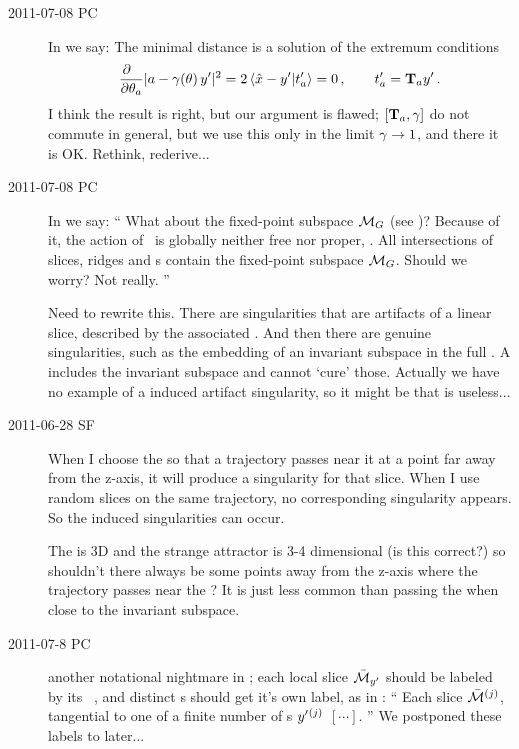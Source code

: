 \begin{description}
\item[2011-07-08 PC]
In  we say: The minimal distance is a solution of the
extremum conditions
\[ %
\frac{\partial ~~}{\partial \gSpace_a} |\ssp - \LieEl(\gSpace)\,\slicep|^2
   =
2\, \braket{\sspRed - \slicep}{\sliceTan{a}}
   = 0
    \,,\qquad
	  \sliceTan{a} = \Lg_a \slicep
\,.
\] %
I think the result is right, but our argument is flawed; $[\mathbf{T}_a,\gamma]$
do not commute in general, but we use this only in the limit $\gamma \to
1$, and there it is OK. Rethink, rederive...

\item[2011-07-08 PC]
In  we say:
``
What about the fixed-point subspace ${\cal M}_{G}$ (see )?
Because of it, the action of \Group\ is globally neither free nor proper,
\etc. All intersections of slices, ridges and {\sset s} contain the
fixed-point subspace ${\cal M}_{G}$. Should we worry? Not really.
''

Need to rewrite this. There are singularities that are artifacts of a
linear slice, described by the associated {\sset}. And then there are
genuine singularities, such as the embedding of an invariant subspace in
the full \statesp. A {\sset} includes the invariant subspace and cannot
`cure' those. Actually we have no example of a {\sset} induced artifact
singularity, so it might be that {\sset} is useless...

\item[2011-06-28 SF]
When I choose the {\sset} so that a trajectory passes near it at a point
far away from the z-axis, it will produce a singularity for that slice.
When I use random slices on the same trajectory, no corresponding
singularity appears. So the {\sset} induced singularities can occur.

The {\sset} is 3D and the strange attractor is 3-4 dimensional (is this
correct?) so shouldn't there always be some points away from the z-axis
where the trajectory passes near the {\sset}? It is just less common than
passing the {\sset} when close to the invariant subspace.

\item[2011-07-8 PC]
another notational nightmare in ; each local slice
$\bar{\cal M}_{{y'}} $ should be labeled by its \template\ \slicep, and
distinct \template s should get it's own label, as in
:
``
Each slice $\bar{\cal M}{}^{(j)}$, tangential to one of a finite number of
{\template s}  ${y'}{}^{(j)}$ $[\cdots]$.
''
We postponed these labels to later...


\end{description}


